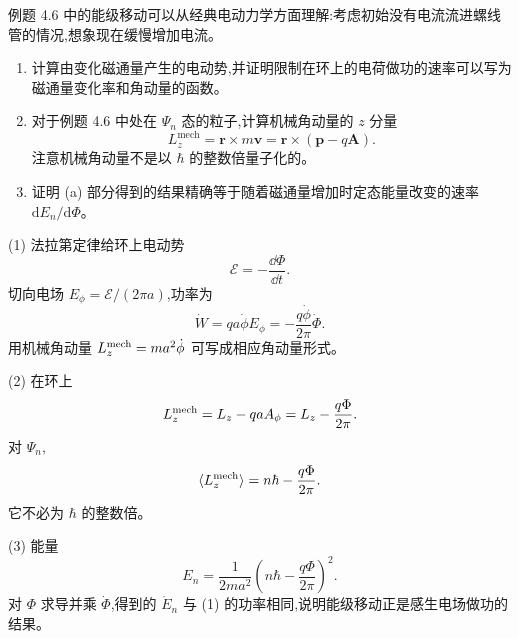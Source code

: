\begin{question}
例题 4.6 中的能级移动可以从经典电动力学方面理解:考虑初始没有电流流进螺线管的情况,想象现在缓慢增加电流。
\begin{enumerate}
\item 计算由变化磁通量产生的电动势,并证明限制在环上的电荷做功的速率可以写为磁通量变化率和角动量的函数。
\item 对于例题 4.6 中处在 $\Psi_n$ 态的粒子,计算机械角动量的 $z$ 分量
\[
L_z^{\mathrm{mech}}=\mathbf r\times m\mathbf v=\mathbf r\times(\mathbf p-q\mathbf A).
\]
注意机械角动量不是以 $\hbar$ 的整数倍量子化的。
\item 证明 (a) 部分得到的结果精确等于随着磁通量增加时定态能量改变的速率 $\mathrm dE_n/\mathrm d\Phi$。
\end{enumerate}
\end{question}
\begin{solution}

(1) 法拉第定律给环上电动势
\[
\mathcal E=-\frac{\dd\Phi}{\dd t}.
\]
切向电场 $E_\phi=\mathcal E/(2\pi a)$,功率为
\[
\dot W=q a\dot\phi E_\phi=-\frac{q\dot\phi}{2\pi}\dot\Phi.
\]
用机械角动量 $L_z^{\rm mech}=ma^2\dot\phi$ 可写成相应角动量形式。

(2) 在环上
\[
L_z^{\rm mech}=L_z-q a A_\phi=L_z-\frac{q\Phi}{2\pi}.
\]
对 $\Psi_n$,
\[
\langle L_z^{\rm mech}\rangle=n\hbar-\frac{q\Phi}{2\pi}.
\]
它不必为 $\hbar$ 的整数倍。

(3) 能量
\[
E_n=\frac{1}{2ma^2}\left(n\hbar-\frac{q\Phi}{2\pi}\right)^2.
\]
对 $\Phi$ 求导并乘 $\dot\Phi$,得到的 $\dot E_n$ 与 (1) 的功率相同,说明能级移动正是感生电场做功的结果。

\end{solution}

